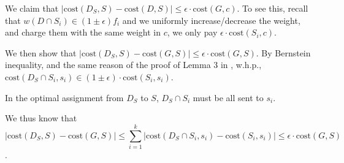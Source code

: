 We claim that $|\mathrm{cost}(D_S,S)-\mathrm{cost}(D,S)|\leq \epsilon \cdot \mathrm{cost}(G,c)$. To see this, recall that $w(D\cap S_i)\in (1\pm \epsilon)f_i$ and we uniformly increase/decrease the weight, and charge them with the same weight in $c$, we only pay $\epsilon\cdot \mathrm{cost}(S_i,c)$. 

We then show that $|\mathrm{cost}(D_S,S)-\mathrm{cost}(G,S)|\leq \epsilon\cdot \mathrm{cost}(G,S)$. By Bernstein inequality, and the same reason of the proof of Lemma 3 in \cite{cohen2021new}, w.h.p., $\mathrm{cost}(D_S\cap S_i,s_i)\in (1\pm \epsilon)\cdot \mathrm{cost}(S_i,s_i)$.

\begin{observation}
In the optimal assignment from $D_S$ to $S$, $D_S\cap S_i$ must be all sent to $s_i$.
\end{observation}

We thus know that $$|\mathrm{cost}(D_S,S)-\mathrm{cost}(G,S)|\leq \sum_{i=1}^k |\mathrm{cost}(D_S\cap S_i,s_i)-\mathrm{cost}(S_i,s_i)|\leq \epsilon\cdot \mathrm{cost}(G,S)$$.